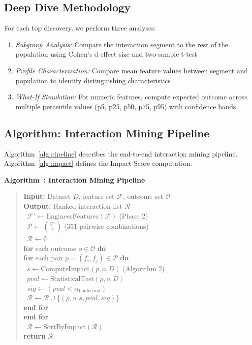 \documentclass[conference]{IEEEtran}
\newcounter{algorithm}
\newenvironment{algorithm}[1][]
  {\refstepcounter{algorithm}\par\medskip\noindent\textbf{Algorithm~\thealgorithm: #1}\par\smallskip\begin{quote}}
  {\end{quote}\par\medskip}
\newcommand{\algorithminput}[1]{\textbf{Input:} #1\\}
\newcommand{\algorithmoutput}[1]{\textbf{Output:} #1\\}
\newcommand{\algorithmstep}[1]{\textbullet~#1\\}
\newcommand{\algorithmfor}[1]{\textbf{for} #1 \textbf{do}\\}
\newcommand{\algorithmendfor}{\textbf{end for}\\}
\newcommand{\algorithmreturn}[1]{\textbf{return} #1\\}
\begin{document}
\subsection{Deep Dive Methodology}

For each top discovery, we perform three analyses:
\begin{enumerate}
    \item \textit{Subgroup Analysis:} Compare the interaction segment to the rest of the population using Cohen's d effect size and two-sample t-test
    \item \textit{Profile Characterization:} Compare mean feature values between segment and population to identify distinguishing characteristics
    \item \textit{What-If Simulation:} For numeric features, compute expected outcome across multiple percentile values (p5, p25, p50, p75, p95) with confidence bands
\end{enumerate}

\subsection{Algorithm: Interaction Mining Pipeline}
\label{sec:algorithm}

Algorithm~\ref{alg:pipeline} describes the end-to-end interaction mining pipeline. Algorithm~\ref{alg:impact} defines the Impact Score computation.

\begin{algorithm}[Interaction Mining Pipeline]\label{alg:pipeline}
\algorithminput{Dataset $D$, feature set $\mathcal{F}$, outcome set $\mathcal{O}$}
\algorithmoutput{Ranked interaction list $\mathcal{R}$}
\algorithmstep{$\mathcal{F}' \gets \text{EngineerFeatures}(\mathcal{F})$ (Phase 2)}
\algorithmstep{$\mathcal{P} \gets \binom{\mathcal{F}'}{2}$ (351 pairwise combinations)}
\algorithmstep{$\mathcal{R} \gets \emptyset$}
\algorithmfor{each outcome $o \in \mathcal{O}$}
\algorithmfor{each pair $p = (f_i, f_j) \in \mathcal{P}$}
\algorithmstep{$s \gets \text{ComputeImpact}(p, o, D)$ (Algorithm 2)}
\algorithmstep{$pval \gets \text{StatisticalTest}(p, o, D)$}
\algorithmstep{$sig \gets (pval < \alpha_{\text{bonferroni}})$}
\algorithmstep{$\mathcal{R} \gets \mathcal{R} \cup \{(p, o, s, pval, sig)\}$}
\algorithmendfor
\algorithmendfor
\algorithmstep{$\mathcal{R} \gets \text{SortByImpact}(\mathcal{R})$}
\algorithmreturn{$\mathcal{R}$}
\end{algorithm}
\end{document}
